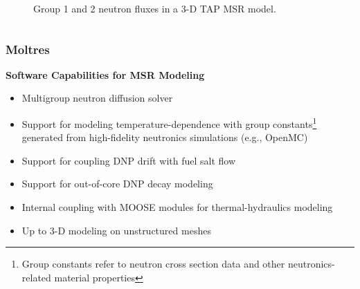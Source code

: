 \begin{frame}
\begin{columns}
\begin{figure}
        \caption{\footnotesize Group 1 and 2 neutron fluxes in a 3-D TAP MSR model.}
      \end{figure}
    \hfill
  \end{columns}
\end{frame}

\begin{frame}
  \frametitle{Moltres}
  \begin{block}{\textbf{Software Capabilities for MSR Modeling}}
    \begin{itemize}
  	  \item Multigroup neutron diffusion solver
      \item Support for modeling temperature-dependence with group
        constants\footnote{Group constants refer to neutron cross section data and other
        neutronics-related material properties} generated
        from high-fidelity neutronics simulations (e.g., OpenMC)
      \item Support for coupling \gls{DNP} drift with fuel salt flow
      \item Support for out-of-core \gls{DNP} decay modeling
      \item Internal coupling with MOOSE modules for thermal-hydraulics modeling
      \item Up to 3-D modeling on unstructured meshes
    \end{itemize}
  \end{block}
\end{frame}

